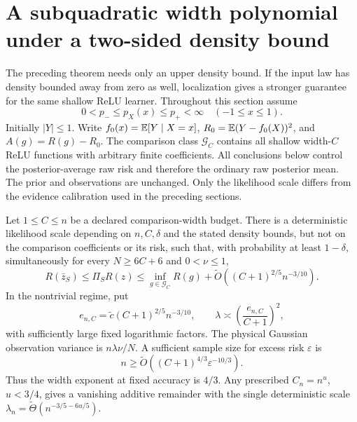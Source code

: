 \section{A subquadratic width polynomial under a two-sided density bound}
\label{sec:localized-results}
The preceding theorem needs only an upper density bound. If the input
law has density bounded away from zero as well, localization gives a
stronger guarantee for the same shallow ReLU learner. Throughout this
section assume
\[
 0<p_-\le p_X(x)\le p_+<\infty\quad(-1\le x\le1).
\]
Initially $|Y|\le1$. Write $f_0(x)=\mathbb E[Y\mid X=x]$,
$R_0=\mathbb E(Y-f_0(X))^2$, and $A(g)=R(g)-R_0$.
The comparison class $\mathcal G_C$ contains all shallow width-$C$
ReLU functions with arbitrary finite coefficients. All conclusions
below control the posterior-average raw risk and therefore the
ordinary raw posterior mean. The prior and observations are unchanged.
Only the likelihood scale differs from the evidence calibration used
in the preceding sections.

\begin{theorem}
\label{thm:localized-width}
Let $1\le C\le n$ be a declared comparison-width budget. There is a
deterministic likelihood scale depending on $n,C,\delta$ and the stated
density bounds, but not on the comparison coefficients or its risk,
such that, with probability at least $1-\delta$, simultaneously for
every $N\ge6C+6$ and $0<\nu\le1$,
\begin{equation}
 R(\bar z_S)\le\Pi_SR(z)
 \le\inf_{g\in\mathcal G_C}R(g)
       +\widetilde O\left((C+1)^{2/5}n^{-3/10}\right).
 \label{eq:localized-budget}
\end{equation}
In the nontrivial regime, put
\[
 e_{n,C}=\widetilde c(C+1)^{2/5}n^{-3/10},\qquad
 \lambda\asymp\left(\frac{e_{n,C}}{C+1}\right)^2,
\]
with sufficiently large fixed logarithmic factors. The physical
Gaussian observation variance is $n\lambda\nu/N$.
A sufficient sample size for excess risk $\varepsilon$ is
\begin{equation}
 n\ge\widetilde O\left((C+1)^{4/3}\varepsilon^{-10/3}\right).
 \label{eq:localized-samples}
\end{equation}
Thus the width exponent at fixed accuracy is $4/3$. Any prescribed
$C_n=n^u$, $u<3/4$, gives a vanishing additive remainder with the
single deterministic scale
$\lambda_n=\widetilde\Theta(n^{-3/5-6u/5})$.
\end{theorem}

